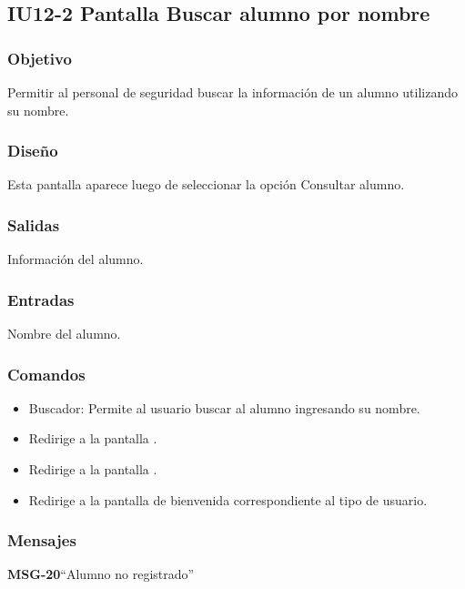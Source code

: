 \subsection{IU12-2 Pantalla Buscar alumno por nombre}

\subsubsection{Objetivo}
Permitir al personal de seguridad buscar la información de un alumno utilizando su nombre. 

\subsubsection{Diseño}
Esta pantalla  aparece luego de seleccionar la opción Consultar alumno. 


\subsubsection{Salidas}
Información del alumno.

\subsubsection{Entradas}
Nombre del alumno. 

\subsubsection{Comandos}

\begin{itemize}

	\item Buscador: Permite al usuario buscar al alumno ingresando su nombre. 
	\item {} Redirige a la pantalla .
    \item {} Redirige a la pantalla .
    \item {} Redirige a la pantalla de bienvenida correspondiente al tipo de usuario.
\end{itemize}

\subsubsection{Mensajes}

\begin{Citemize}
	\item {\bf MSG-20}{``Alumno no registrado''}
\end{Citemize}


